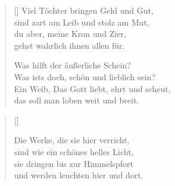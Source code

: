 \begin{multicols}{2}
\begin{verse}[\versewidth]
 Viel Töchter bringen Geld und Gut,\\
sind zart am Leib und stolz am Mut,\\
du aber, meine Kron und Zier,\\
gehst wahrlich ihnen allen für.

 Was hilft der äußerliche Schein?\\
Was ists doch, schön und lieblich sein?\\
Ein Weib, Das Gott liebt, ehrt und scheut,\\
das soll man loben weit und breit.

\end{verse}
\end{multicols}

\begin{center}
\settowidth{\versewidth}{Der, vor dem die Welt erschrickt,}
\begin{verse}[\versewidth]

 Die Werke, die sie hier verricht,\\
sind wie ein schönes helles Licht,\\
sie dringen bis zur Himmelspfort\\
und werden leuchten hier und dort.
  
\end{verse}
\end{center}



